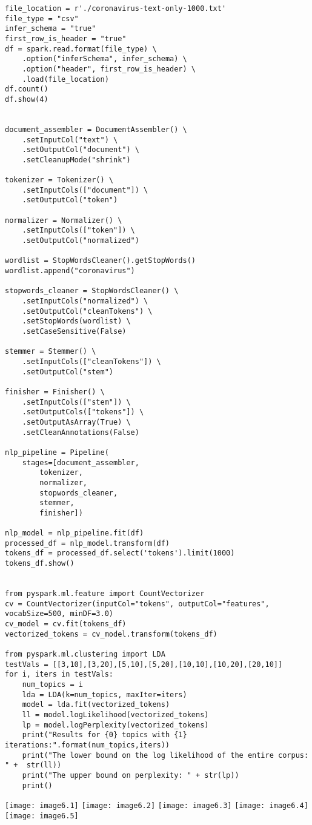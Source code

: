 \documentclass[]{article}
\begin{document}
\begin{verbatim}
file_location = r'./coronavirus-text-only-1000.txt'
file_type = "csv"
infer_schema = "true"
first_row_is_header = "true"
df = spark.read.format(file_type) \
	.option("inferSchema", infer_schema) \
	.option("header", first_row_is_header) \
	.load(file_location)
df.count()
df.show(4)


document_assembler = DocumentAssembler() \
	.setInputCol("text") \
	.setOutputCol("document") \
	.setCleanupMode("shrink")

tokenizer = Tokenizer() \
	.setInputCols(["document"]) \
	.setOutputCol("token")

normalizer = Normalizer() \
	.setInputCols(["token"]) \
	.setOutputCol("normalized")

wordlist = StopWordsCleaner().getStopWords()
wordlist.append("coronavirus")

stopwords_cleaner = StopWordsCleaner() \
	.setInputCols("normalized") \
	.setOutputCol("cleanTokens") \
	.setStopWords(wordlist) \
	.setCaseSensitive(False)

stemmer = Stemmer() \
	.setInputCols(["cleanTokens"]) \
	.setOutputCol("stem")

finisher = Finisher() \
	.setInputCols(["stem"]) \
	.setOutputCols(["tokens"]) \
	.setOutputAsArray(True) \
	.setCleanAnnotations(False)

nlp_pipeline = Pipeline(
	stages=[document_assembler, 
		tokenizer,
		normalizer,
		stopwords_cleaner,
		stemmer, 
		finisher])

nlp_model = nlp_pipeline.fit(df)
processed_df = nlp_model.transform(df)
tokens_df = processed_df.select('tokens').limit(1000)
tokens_df.show()


from pyspark.ml.feature import CountVectorizer
cv = CountVectorizer(inputCol="tokens", outputCol="features", 
vocabSize=500, minDF=3.0)
cv_model = cv.fit(tokens_df)
vectorized_tokens = cv_model.transform(tokens_df)

from pyspark.ml.clustering import LDA
testVals = [[3,10],[3,20],[5,10],[5,20],[10,10],[10,20],[20,10]]
for i, iters in testVals:
	num_topics = i
	lda = LDA(k=num_topics, maxIter=iters)
	model = lda.fit(vectorized_tokens)
	ll = model.logLikelihood(vectorized_tokens)
	lp = model.logPerplexity(vectorized_tokens)
	print("Results for {0} topics with {1} iterations:".format(num_topics,iters))
	print("The lower bound on the log likelihood of the entire corpus: " +  str(ll))
	print("The upper bound on perplexity: " + str(lp))
	print()
\end{verbatim}
\texttt{[image: image6.1]} %
\texttt{[image: image6.2]} %
\texttt{[image: image6.3]} %
\texttt{[image: image6.4]} %
\texttt{[image: image6.5]} %
\end{document}
